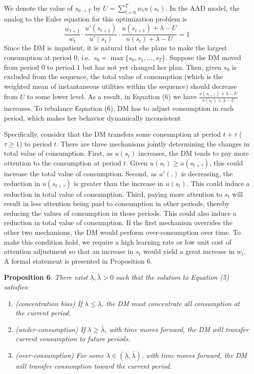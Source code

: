\documentclass[
  12pt,
]{article}
\begin{document}
We denote the value of \(s_{0\rightarrow T}\) by
\(U=\sum_{t=0}^T w_t u(s_t)\). In the AAD model, the analog to the Euler
equation for this optimization problem is\[\tag{6}
\frac{w_{t+1}}{w_t}\cdot\frac{u'(s_{t+1})}{u'(s_t)}\cdot\frac{u(s_{t+1})+\lambda-U}{u(s_t)+\lambda-U}=1
\]Since the DM is impatient, it is natural that she plans to make the
largest consumption at period 0, i.e.~\(s_0=\max\{s_0,s_1,…,s_T\}\).
Suppose the DM moved from period 0 to period 1 but has not yet changed
her plan. Then, given \(s_0\) is excluded from the sequence, the total
value of consumption (which is the weighted mean of instantaneous
utilities within the sequence) should decrease from \(U\) to some lower
level. As a result, in Equation (6) we have
\(\frac{v(s_{t+1})+\lambda-U}{v(s_t)+\lambda-U}\) increases. To
rebalance Equation (6), DM has to adjust consumption in each period,
which makes her behavior dynamically inconsistent.

Specifically, consider that the DM transfers some consumption at period
\(t+\tau\) (\(\tau\geq 1\)) to period \(t\). There are three mechanisms
jointly determining the changes in total value of consumption. First, as
\(u(s_t)\) increases, the DM tends to pay more attention to the
consumption at period \(t\). Given \(u(s_{t})\geq u(s_{t+\tau})\), this
could increase the total value of consumption. Second, as \(u'(.)\) is
decreasing, the reduction in \(u(s_{t+\tau})\) is greater than the
increase in \(u(s_t)\). This could induce a reduction in total value of
consumption. Third, paying more attention to \(s_t\) will result in less
attention being paid to consumption in other periods, thereby reducing
the values of consumption in those periods. This could also induce a
reduction in total value of consumption. If the first mechanism
overrides the other two mechanisms, the DM would perform
over-consumption over time. To make this condition hold, we require a
high learning rate or low unit cost of attention adjustment so that an
increase in \(s_t\) would yield a great increase in \(w_t\). A formal
statement is presented in Proposition 6.

\noindent \textbf{Proposition 6}: \emph{There exist}
\(\underline{\lambda},\bar{\lambda}>0\) \emph{such that the solution to
Equation (5) satisfies:}

\begin{enumerate}
\def\labelenumi{(\alph{enumi})}
\item
  \emph{(concentration bias) If}
  \(\lambda\leq\underline{\lambda}\)\emph{, the DM must concentrate all
  consumption at the current period.}
\item
  \emph{(under-consumption) If} \(\lambda\geq\bar{\lambda}\)\emph{, with
  time moves forward, the DM will transfer current consumption to future
  periods.}
\item
  \emph{(over-consumption) For some}
  \(\lambda\in(\underline{\lambda},\bar{\lambda})\)\emph{, with time
  moves forward, the DM will transfer consumption toward the current
  period.}
\end{enumerate}
\end{document}
